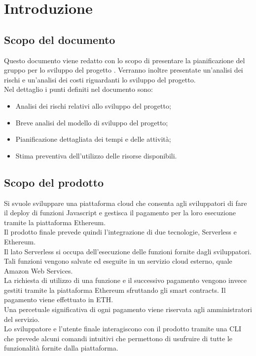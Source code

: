 \section{Introduzione}
\subsection{Scopo del documento}
Questo documento viene redatto con lo scopo di presentare la pianificazione del gruppo \Gruppo{} per lo sviluppo del progetto \NomeProgetto{}. Verranno inoltre presentate un'analisi dei rischi e un'analisi dei costi riguardanti lo sviluppo del progetto.\\
Nel dettaglio i punti definiti nel documento sono:
\begin{itemize}
	\item Analisi dei rischi relativi allo sviluppo del progetto;
	\item Breve analisi del modello di sviluppo del progetto;
	\item Pianificazione dettagliata dei tempi e delle attività;
	\item Stima preventiva dell'utilizzo delle risorse disponibili.
\end{itemize}
\subsection{Scopo del prodotto}
Si svuole sviluppare una piattaforma cloud che consenta agli sviluppatori di fare il deploy di funzioni Javascript e gestisca il pagamento per la loro esecuzione tramite la piattaforma Ethereum.\\
Il prodotto finale prevede quindi l'integrazione di due tecnologie, Serverless e Ethereum.\\
Il lato Serverless si occupa dell'esecuzione delle funzioni fornite dagli sviluppatori. Tali funzioni vengono salvate ed eseguite in un servizio cloud esterno, quale Amazon Web Services.\\
La richiesta di utilizzo di una funzione e il successivo pagamento vengono invece gestiti tramite la piattaforma Ethereum sfruttando gli smart contracts. Il pagamento viene effettuato in ETH.\\
Una percetuale significativa di ogni pagamento viene riservata agli amministratori del servizio.\\
Lo sviluppatore e l'utente finale interagiscono con il prodotto tramite una CLI che prevede alcuni comandi intuitivi che permettono di usufruire di tutte le funzionalità fornite dalla piattaforma.

